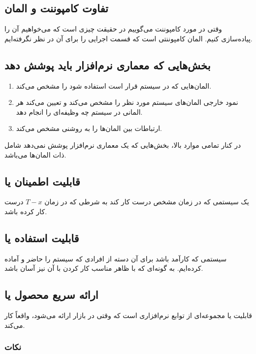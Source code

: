 \subsection{تفاوت کامپوننت و المان}

وقتی در مورد کامپوننت می‌گوییم در حقیقت چیزی است که می‌خواهیم آن را پیاده‌سازی
کنیم. المان کامپوننتی است که قسمت اجرایی را برای آن در نظر نگرفته‌ایم.

\subsection{بخش‌هایی که معماری نرم‌افزار باید پوشش دهد}

\begin{enumerate}
    \item المان‌هایی که در سیستم قرار است استفاده شود را مشخص می‌کند.
    \item نمود خارجی المان‌های سیستم مورد نظر را مشخص می‌کند و تعیین می‌کند هر
    المانی در سیستم چه وظیفه‌ای را انجام دهد.
    \item ارتباطات بین المان‌ها را به روشنی مشخص می‌کند.
\end{enumerate}

در کنار تمامی موارد بالا، بخش‌هایی که یک معماری نرم‌افزار پوشش نمی‌دهد شامل ذات
المان‌ها می‌باشد.

\subsection{قابلیت اطمینان یا }

یک سیستمی که در زمان مشخص درست کار کند به شرطی که در زمان $T - x$ درست کار کرده
باشد.

\subsection{قابلیت استفاده یا }

سیستمی که کارآمد باشد برای آن دسته از افرادی که سیستم را حاضر و آماده کرده‌ایم.
به گونه‌ای که با ظاهر مناسب کار کردن با آن نیز آسان باشد.

\subsection{ارائه سریع محصول یا }

قابلیت یا  مجموعه‌ای از توابع نرم‌افزاری است که وقتی در بازار ارائه
می‌شود، واقعاً کار می‌کند. 

\subsubsection*{نکات}

